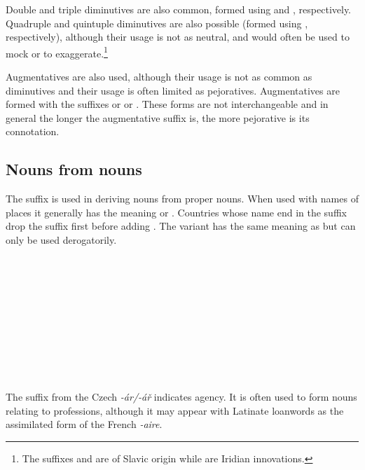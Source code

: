 Double and triple diminutives are also common, formed using  and , respectively. Quadruple and quintuple diminutives are also possible (formed using  , respectively), although their usage is not as neutral, and would often be used to mock or to exaggerate.\footnote{The suffixes  and  are of Slavic origin while   are Iridian innovations.}

Augmentatives are also used, although their usage is not as common as diminutives and their usage is often limited as pejoratives. Augmentatives are formed with the suffixes  or  or . These forms are not interchangeable and in general the longer the augmentative suffix is, the more pejorative is its connotation.

\subsection{Nouns from nouns}

The suffix  is used in deriving nouns from proper nouns. When used with names of places it generally has the meaning  or . Countries whose name end in the suffix  drop the suffix first before adding . The variant  has the same meaning as  but can only be used derogatorily.

\begin{multicols}{2}
  \ex
  \\
  \\
  \\
  \\
  \\
  \\
  \\
  \\
  \\
  \xe
\end{multicols}


The suffix  from the Czech \emph{-ár/-ář} indicates agency. It is often used to form nouns relating to professions, although it may appear with Latinate loanwords as the assimilated form of the French \emph{-aire}.

